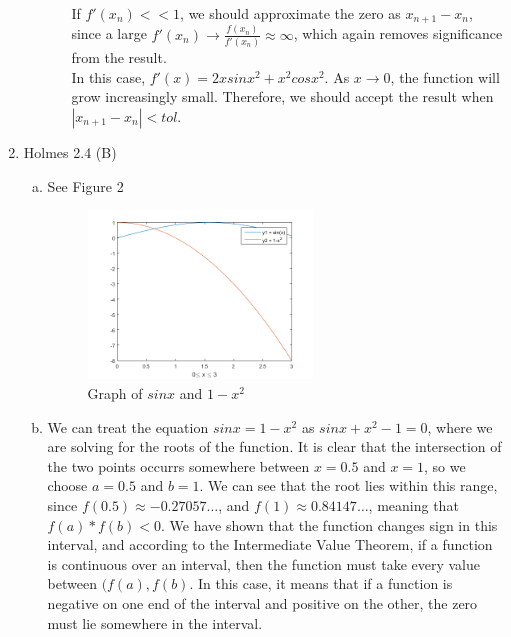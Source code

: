 \documentclass[11pt]{article}
\begin{document}
\begin{enumerate}
\begin{enumerate}[(a)]
\begin{enumerate}[i.]
			If $f'(x_n) << 1$, we should approximate the zero as $x_{n+1}-
			x_n$, since a large $f'(x_n) \to \frac{f(x_n)}{f'(x_n)} \approx \infty$, which again removes significance
			from the result. \\

			In this case, $f'(x) = 2xsinx^2 + x^2cosx^2$. As $x\to0$, the function will grow increasingly small. Therefore,
			we should accept the result when $|x_{n+1} - x_n| < tol$. \\
		\end{enumerate}

	\end{enumerate}

\item Holmes 2.4 (B)

	\begin{enumerate}[(a)]

		\item See Figure 2
			\begin{figure}[H]
			\centering
			\includegraphics[width=0.6\textwidth]{q2_graph.png}
			\caption{Graph of $sinx$ and $1-x^2$}
		\end{figure}

		\item We can treat the equation $sinx = 1-x^2$ as $sinx + x^2 - 1 = 0$, where we are solving for the roots of the function.
		It is clear that the intersection of the two points occurrs somewhere between $x=0.5$ and $x=1$, so we choose $a = 0.5$ and
		$b=1$. We can see that the root lies within this range, since $f(0.5) \approx -0.27057\dots$, and $f(1) \approx 0.84147\dots$,
		meaning that $f(a) * f(b) < 0$. We have shown that the function changes sign in this interval, and according to the
		Intermediate Value Theorem, if a function is continuous over an interval, then the function must take every value between
		$(f(a), f(b)$. In this case, it means that if a function is negative on one end of the interval and positive on the other,
		the zero must lie somewhere in the interval.\\


\end{enumerate}
\end{enumerate}
\end{document}

